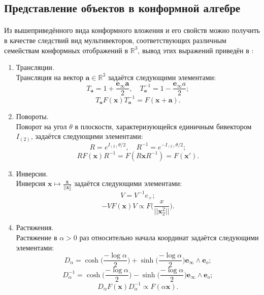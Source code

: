 \documentclass[12pt]{article}
\begin{document}
\newpage

\subsection{Представление объектов в конформной алгебре}\label{CGA_objects}
    \paragraph{}
    Из вышеприведённого вида конформного вложения и его свойств можно получить в качестве следствий вид мультивекторов, соответствующих различным семействам конформных отображений в $\mathds{R}^3$, вывод этих выражений приведён в \cite{Miller2013GeometricAA}:
    \begin{enumerate}
        \item Трансляции.\\
        Трансляция на вектор $\mathbf{a} \in \mathds{R}^3$ задаётся следующими элементами:
        $$ T_\mathbf{a} = 1 + \frac{\mathbf{e}_{\infty}\mathbf{a}}{2}, \quad  T_\mathbf{a}^{-1} = 1 - \frac{\mathbf{e}_{\infty}a}{2};$$
        $$ T_\mathbf{a} F(\mathbf{x})T_\mathbf{a}^{-1} = F(\mathbf{x} + \mathbf{a}).$$
        \item Повороты.\\
        Поворот на угол $\theta$ в плоскости, характеризующейся единичным бивектором $I_{(2)}$, задаётся следующими элементами:
        $$ R = e^{I_{(2)}\theta/2}, \quad R^{-1} = e^{-I_{(2)}\theta/2};$$
        $$ R F(\mathbf{x})R^{-1} = F(R\mathbf{x}R^{-1}) = F(\mathbf{x'}).$$
        \item Инверсии.\\
        Инверсия $\mathbf{x} \mapsto \frac{\mathbf{x}}{||\mathbf{x}_2^2}$ задаётся следующими элементами:
        $$ V = V^{-1}e_+ ;$$
        $$ -VF(\mathbf{x})V \propto F\Big(\frac{x}{||\mathbf{x}_2^2||}\Big) .$$
        \item Растяжения.\\
        Растяжение в $\alpha > 0$ раз относительно начала координат задаётся следующими элементами:
        $$ D_{\alpha} = \cosh\Bigg(\frac{-\log \alpha}{2}\Bigg) + \sinh\Bigg(\frac{-\log \alpha}{2}\Bigg) \mathbf{e}_{\infty} \wedge \mathbf{e}_o;$$
        $$ D_{\alpha}^{-1} = \cosh\Bigg(\frac{-\log \alpha}{2}\Bigg) - \sinh\Bigg(\frac{-\log \alpha}{2}\Bigg)  \mathbf{e}_{\infty} \wedge \mathbf{e}_o;$$
        $$ D_{\alpha}F(\mathbf{x})D_{\alpha}^{-1} \propto F(\alpha \mathbf{x}). $$
    \end{enumerate}
    
\end{document}
